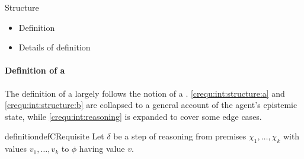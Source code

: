 \begin{note}
  Structure
  \begin{itemize}
  \item Definition
  \item Details of definition
  \end{itemize}
\end{note}

\paragraph{Definition of a \crequ{}}


\begin{note}
  The definition of a \crequ{} largely follows the notion of a \crequ{}.
  \ref{crequ:int:structure:a} and \ref{crequ:int:structure:b} are collapsed to a general account of the agent's epistemic state, while \ref{crequ:int:reasoning} is expanded to cover some edge cases.

  \begin{restatable}[A \crequ{0}]{definition}{defCRequisite}
    \label{def:requ:crequ}
    Let \(\delta\) be a step of reasoning from premises \(\chi_{1},\dots,\chi_{k}\) with values \(v_{1},\dots,v_{k}\) to \(\phi\) having value \(v\).


\end{restatable}
\end{note}
